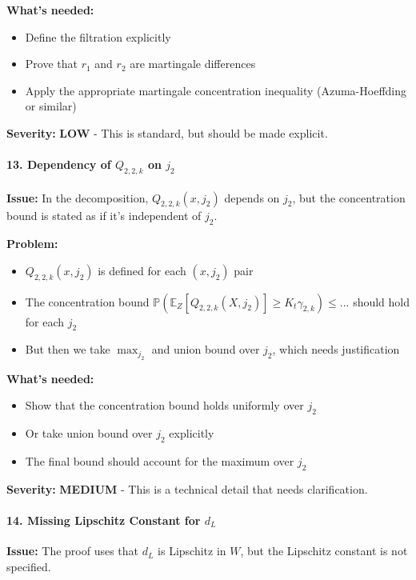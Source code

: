 \textbf{What's needed:}
\begin{itemize}
\item Define the filtration explicitly
\item Prove that $r_1$ and $r_2$ are martingale differences
\item Apply the appropriate martingale concentration inequality (Azuma-Hoeffding or similar)
\end{itemize}

\textbf{Severity:} \textbf{LOW} - This is standard, but should be made explicit.

\paragraph*{13. Dependency of $Q_{2,2,k}$ on $j_2$}

\textbf{Issue:} In the decomposition, $Q_{2,2,k}(x, j_2)$ depends on $j_2$, but the concentration bound is stated as if it's independent of $j_2$.

\textbf{Problem:}
\begin{itemize}
\item $Q_{2,2,k}(x, j_2)$ is defined for each $(x, j_2)$ pair
\item The concentration bound $\mathbb{P}(\mathbb{E}_Z[Q_{2,2,k}(X, j_2)] \ge K_t\gamma_{2,k}) \le ...$ should hold for each $j_2$
\item But then we take $\max_{j_2}$ and union bound over $j_2$, which needs justification
\end{itemize}

\textbf{What's needed:}
\begin{itemize}
\item Show that the concentration bound holds uniformly over $j_2$
\item Or take union bound over $j_2$ explicitly
\item The final bound should account for the maximum over $j_2$
\end{itemize}

\textbf{Severity:} \textbf{MEDIUM} - This is a technical detail that needs clarification.

\paragraph*{14. Missing Lipschitz Constant for $d_L$}

\textbf{Issue:} The proof uses that $d_L$ is Lipschitz in $W$, but the Lipschitz constant is not specified.

